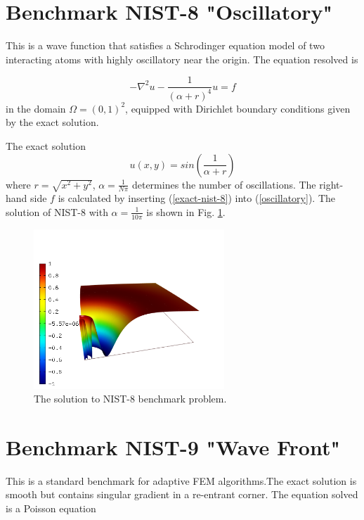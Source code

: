 \documentclass[12pt]{elsarticle}
\begin{document}
\section{Benchmark NIST-8 "Oscillatory"}
\label{sec:bench-8}

This is a wave function that satisfies a Schrodinger equation model of two
interacting atoms with highly oscillatory near the origin.
The equation resolved is

\begin{equation} \label{oscillatory}
-\nabla^{2} u - \frac{1}{(\alpha + r)^{4}} u = f
\end{equation}
in the domain $\Omega = (0, 1)^2$, equipped with Dirichlet boundary conditions
given by the exact solution.

The exact solution
\begin{equation}\label{exact-nist-8}
u(x,y) = sin(\frac{1}{\alpha + r})
\end{equation}
where $r = \sqrt{x^{2} + y^{2}}$, $\alpha = \frac{1}{N \pi}$ determines the number of oscillations.
The right-hand side $f$ is calculated by inserting (\ref{exact-nist-8}) into (\ref{oscillatory}).
The solution of NIST-8 with $\alpha = \frac{1}{10 \pi}$ is shown in Fig. \ref{fig:sln-nist08}.

\begin{figure}[!ht]
\centering
\includegraphics[height=6cm]{nist/nist-8/solution.png}
\caption{The solution to NIST-8 benchmark problem.}
\label{fig:sln-nist08}
\end{figure}

\section{Benchmark NIST-9 "Wave Front"}
\label{sec:bench-9}

This is a standard benchmark for adaptive FEM algorithms.The exact solution is smooth
but contains singular gradient in a re-entrant corner.
The equation solved is a Poisson equation
\end{document}
